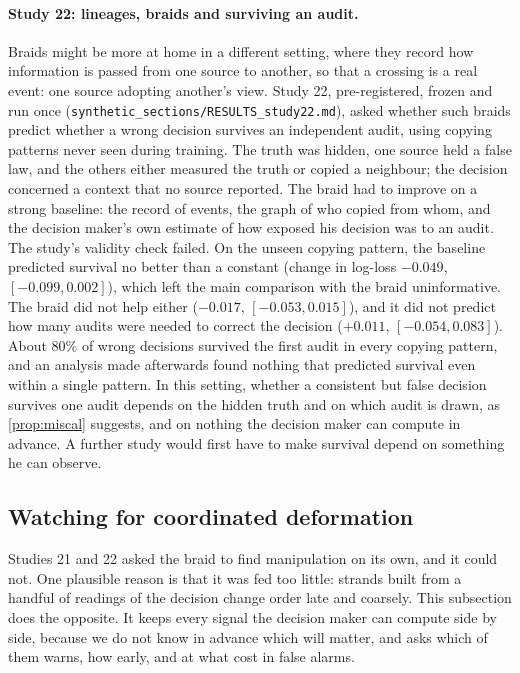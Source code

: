 \documentclass[11pt]{article}
\theoremstyle{definition}\newtheorem{definition}[theorem]{Definition}\newtheorem{remark}[theorem]{Remark}\newtheorem{example}[theorem]{Example}\newtheorem{problem}[theorem]{Open problem}\crefname{problem}{Problem}{Problems}
\begin{document}
\paragraph{Study 22: lineages, braids and surviving an audit.} Braids might be more at home in a different setting, where they record how information is passed from one source to another, so that a crossing is a real event: one source adopting another's view. Study 22, pre-registered, frozen and run once (\texttt{synthetic\_sections/RESULTS\_study22.md}), asked whether such braids predict whether a wrong decision survives an independent audit, using copying patterns never seen during training. The truth was hidden, one source held a false law, and the others either measured the truth or copied a neighbour; the decision concerned a context that no source reported. The braid had to improve on a strong baseline: the record of events, the graph of who copied from whom, and the decision maker's own estimate of how exposed his decision was to an audit. The study's validity check failed. On the unseen copying pattern, the baseline predicted survival no better than a constant (change in log-loss $-0.049$, $[-0.099,0.002]$), which left the main comparison with the braid uninformative. The braid did not help either ($-0.017$, $[-0.053,0.015]$), and it did not predict how many audits were needed to correct the decision ($+0.011$, $[-0.054,0.083]$). About $80\%$ of wrong decisions survived the first audit in every copying pattern, and an analysis made afterwards found nothing that predicted survival even within a single pattern. In this setting, whether a consistent but false decision survives one audit depends on the hidden truth and on which audit is drawn, as \cref{prop:miscal} suggests, and on nothing the decision maker can compute in advance. A further study would first have to make survival depend on something he can observe.


\subsection{Watching for coordinated deformation}\label{sec:watch}
Studies 21 and 22 asked the braid to find manipulation on its own, and it could not. One plausible reason is that it was fed too little: strands built from a handful of readings of the decision change order late and coarsely. This subsection does the opposite. It keeps every signal the decision maker can compute side by side, because we do not know in advance which will matter, and asks which of them warns, how early, and at what cost in false alarms.
\end{document}
